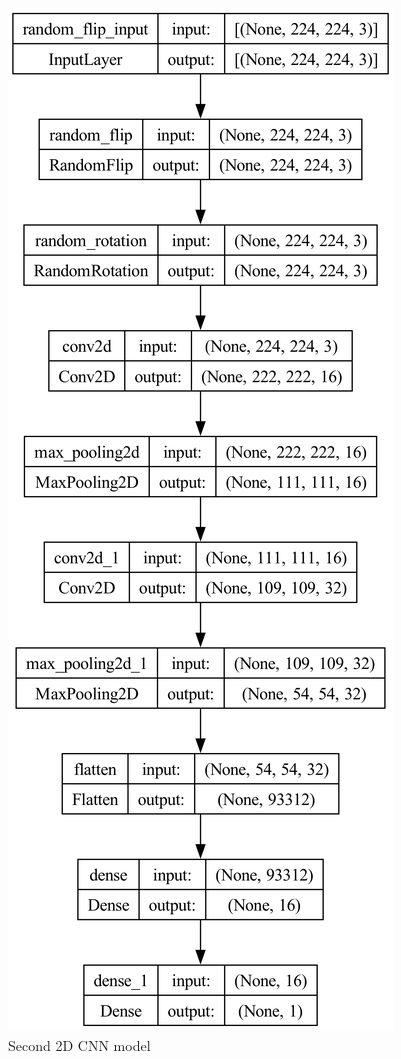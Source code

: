 \begin{figure}[]
    \centering
    \includegraphics[scale=0.2]{images/simple4augnozoom.png}
    \caption{Second 2D CNN model}
    \label{fig:Second2DCNN}
\end{figure}

